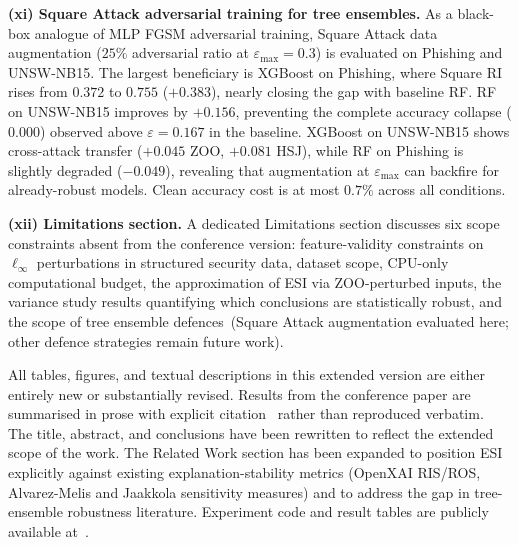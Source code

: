 \documentclass[12pt]{article}
\begin{document}
\textbf{(xi) Square Attack adversarial training for tree ensembles.}
As a black-box analogue of MLP FGSM adversarial training, Square Attack data
augmentation ($25\%$ adversarial ratio at $\varepsilon_{\max}=0.3$) is evaluated
on Phishing and UNSW-NB15.  The largest beneficiary is XGBoost on Phishing,
where Square RI rises from $0.372$ to $0.755$ ($+0.383$), nearly closing the gap
with baseline RF.  RF on UNSW-NB15 improves by $+0.156$, preventing the complete
accuracy collapse ($0.000$) observed above $\varepsilon=0.167$ in the baseline.
XGBoost on UNSW-NB15 shows cross-attack transfer ($+0.045$ ZOO, $+0.081$ HSJ),
while RF on Phishing is slightly degraded ($-0.049$), revealing that augmentation
at $\varepsilon_{\max}$ can backfire for already-robust models.  Clean accuracy
cost is at most $0.7\%$ across all conditions.

\textbf{(xii) Limitations section.}
A dedicated Limitations section discusses six scope constraints absent from the
conference version: feature-validity constraints on $\ell_\infty$ perturbations
in structured security data, dataset scope, CPU-only computational budget,
the approximation of ESI via ZOO-perturbed inputs, the variance study
results quantifying which conclusions are statistically robust, and the
scope of tree ensemble defences~(Square Attack augmentation evaluated here;
other defence strategies remain future work).

All tables, figures, and textual descriptions in this extended version are either
entirely new or substantially revised.  Results from the conference paper are
summarised in prose with explicit citation~\cite{khawarey2026empirical} rather
than reproduced verbatim.  The title, abstract, and conclusions have been rewritten
to reflect the extended scope of the work.  The Related Work section has been
expanded to position ESI explicitly against existing explanation-stability metrics
(OpenXAI RIS/ROS, Alvarez-Melis and Jaakkola sensitivity measures) and to address
the gap in tree-ensemble robustness literature.  Experiment code and result tables
are publicly available at~\cite{khawarey2026code}.



\end{document}
